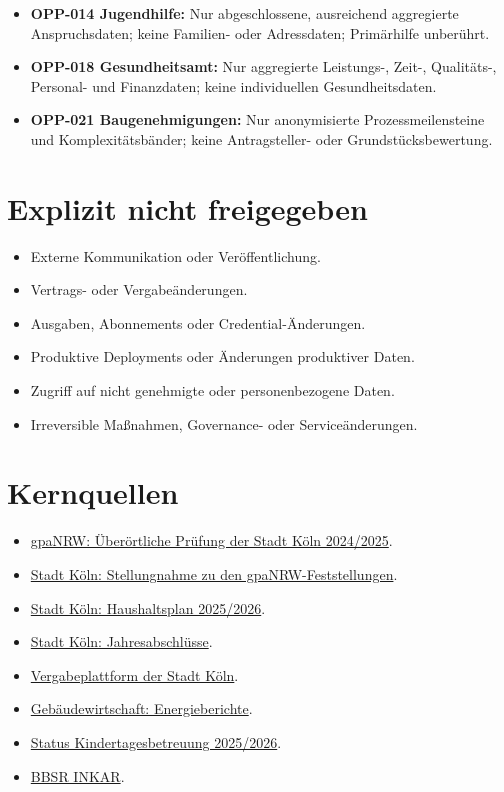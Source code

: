 \documentclass[11pt,a4paper]{article}
\begin{document}
\begin{itemize}
  \item \textbf{OPP-014 Jugendhilfe:} Nur abgeschlossene, ausreichend aggregierte Anspruchsdaten; keine Familien- oder Adressdaten; Primärhilfe unberührt.
  \item \textbf{OPP-018 Gesundheitsamt:} Nur aggregierte Leistungs-, Zeit-, Qualitäts-, Personal- und Finanzdaten; keine individuellen Gesundheitsdaten.
  \item \textbf{OPP-021 Baugenehmigungen:} Nur anonymisierte Prozessmeilensteine und Komplexitätsbänder; keine Antragsteller- oder Grundstücksbewertung.
\end{itemize}

\section{Explizit nicht freigegeben}

\begin{itemize}
  \item Externe Kommunikation oder Veröffentlichung.
  \item Vertrags- oder Vergabeänderungen.
  \item Ausgaben, Abonnements oder Credential-Änderungen.
  \item Produktive Deployments oder Änderungen produktiver Daten.
  \item Zugriff auf nicht genehmigte oder personenbezogene Daten.
  \item Irreversible Maßnahmen, Governance- oder Serviceänderungen.
\end{itemize}

\appendix
\section{Kernquellen}

\begin{itemize}
  \item \href{https://gpanrw.de/sites/default/files/2026-01/Gesamtbericht_Stadt_Koeln_2024_2025.pdf}{gpaNRW: Überörtliche Prüfung der Stadt Köln 2024/2025}.
  \item \href{https://gpanrw.de/sites/default/files/2026-02/Stellungnahme_Stadt_K%C3%B6ln_2025.pdf}{Stadt Köln: Stellungnahme zu den gpaNRW-Feststellungen}.
  \item \href{https://www.stadt-koeln.de/artikel/60791/index.html}{Stadt Köln: Haushaltsplan 2025/2026}.
  \item \href{https://www.stadt-koeln.de/politik-und-verwaltung/finanzen/jahresabschluesse}{Stadt Köln: Jahresabschlüsse}.
  \item \href{https://vergabeplattform.stadt-koeln.de/NetServer/}{Vergabeplattform der Stadt Köln}.
  \item \href{https://www.stadt-koeln.de/politik-und-verwaltung/gebaeudewirtschaft-der-stadt-koeln/berichte}{Gebäudewirtschaft: Energieberichte}.
  \item \href{https://www.stadt-koeln.de/politik-und-verwaltung/presse/mitteilungen/28216/index.html}{Status Kindertagesbetreuung 2025/2026}.
  \item \href{https://www.inkar.de/}{BBSR INKAR}.
\end{itemize}
\end{document}
